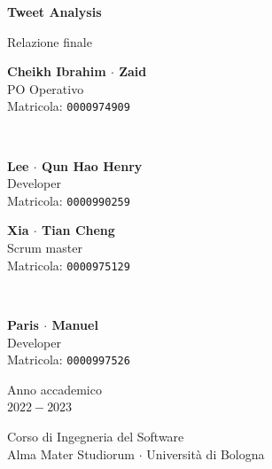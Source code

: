 \documentclass[11pt]{article}
\begin{document}
\begin{titlepage}
    \begin{center}
        \vspace*{1.5cm}
            
        \Huge
        \textbf{Tweet Analysis}
            
        \vspace{0.3cm}
        \LARGE
        Relazione finale\\[0.2em]

        \vspace{1.5cm}
          
        \begin{minipage}[t]{0.47\textwidth}
            \begin{center}
                \parbox{50mm}{\centering\large {\bf Cheikh Ibrahim $\cdot$ Zaid} \\[0.2em] PO Operativo \\[0.3em] Matricola: \texttt{0000974909}}\\[2em]
                \parbox{50mm}{\centering\large {\bf Lee $\cdot$ Qun Hao Henry} \\[0.2em] Developer \\[0.3em] Matricola: \texttt{0000990259}}
            \end{center}
		\end{minipage}
		\hfill
		\begin{minipage}[t]{0.47\textwidth}\raggedleft
            \begin{center}
                \parbox{50mm}{\centering\large {\bf Xia $\cdot$ Tian Cheng} \\[0.2em] Scrum master \\[0.3em] Matricola: \texttt{0000975129}}\\[2em]
                \parbox{50mm}{\centering\large {\bf Paris $\cdot$ Manuel} \\[0.2em] Developer \\[0.3em] Matricola: \texttt{0000997526}}
            \end{center}
		\end{minipage}  
            
        \vspace{6cm}
            
        Anno accademico\\
        $2022 - 2023$
            
        \vspace{0.8cm}
            
            
        \Large
        Corso di Ingegneria del Software\\
        Alma Mater Studiorum $\cdot$ Università di Bologna\\
            
    \end{center}
\end{titlepage}
\pagebreak
\end{document}
